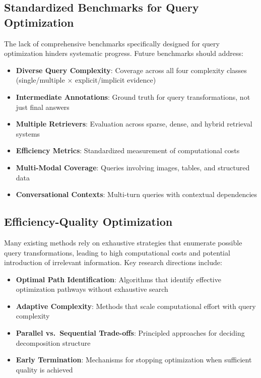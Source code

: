 \documentclass{article}
\begin{document}
\subsection{Standardized Benchmarks for Query Optimization}

The lack of comprehensive benchmarks specifically designed for query optimization hinders systematic progress. Future benchmarks should address:

\begin{itemize}[leftmargin=*,nosep]
    \item \textbf{Diverse Query Complexity}: Coverage across all four complexity classes (single/multiple × explicit/implicit evidence)
    \item \textbf{Intermediate Annotations}: Ground truth for query transformations, not just final answers
    \item \textbf{Multiple Retrievers}: Evaluation across sparse, dense, and hybrid retrieval systems
    \item \textbf{Efficiency Metrics}: Standardized measurement of computational costs
    \item \textbf{Multi-Modal Coverage}: Queries involving images, tables, and structured data
    \item \textbf{Conversational Contexts}: Multi-turn queries with contextual dependencies
\end{itemize}

\subsection{Efficiency-Quality Optimization}

Many existing methods rely on exhaustive strategies that enumerate possible query transformations, leading to high computational costs and potential introduction of irrelevant information. Key research directions include:

\begin{itemize}[leftmargin=*,nosep]
    \item \textbf{Optimal Path Identification}: Algorithms that identify effective optimization pathways without exhaustive search
    \item \textbf{Adaptive Complexity}: Methods that scale computational effort with query complexity
    \item \textbf{Parallel vs.\ Sequential Trade-offs}: Principled approaches for deciding decomposition structure
    \item \textbf{Early Termination}: Mechanisms for stopping optimization when sufficient quality is achieved
\end{itemize}
\end{document}

